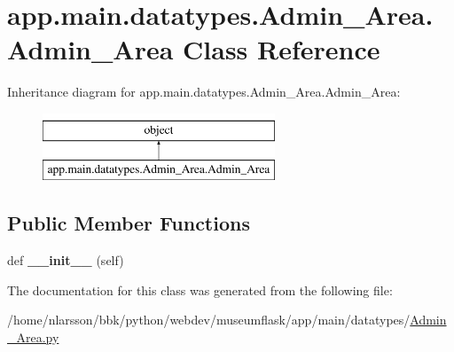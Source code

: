\hypertarget{classapp_1_1main_1_1datatypes_1_1Admin__Area_1_1Admin__Area}{}\section{app.\+main.\+datatypes.\+Admin\+\_\+\+Area.\+Admin\+\_\+\+Area Class Reference}
\label{classapp_1_1main_1_1datatypes_1_1Admin__Area_1_1Admin__Area}
Inheritance diagram for app.\+main.\+datatypes.\+Admin\+\_\+\+Area.\+Admin\+\_\+\+Area\+:\begin{figure}[H]
\begin{center}
\leavevmode
\includegraphics[height=2.000000cm]{classapp_1_1main_1_1datatypes_1_1Admin__Area_1_1Admin__Area}
\end{center}
\end{figure}
\subsection*{Public Member Functions}
\begin{DoxyCompactItemize}
\item 
\mbox{\label{classapp_1_1main_1_1datatypes_1_1Admin__Area_1_1Admin__Area_ab1b3d88cfabc030d45e8b5ae6c710a52}} 
def {\bfseries \+\_\+\+\_\+init\+\_\+\+\_\+} (self)
\end{DoxyCompactItemize}


The documentation for this class was generated from the following file\+:\begin{DoxyCompactItemize}
\item 
/home/nlarsson/bbk/python/webdev/museumflask/app/main/datatypes/\mbox{\hyperlink{Admin__Area_8py}{Admin\+\_\+\+Area.\+py}}\end{DoxyCompactItemize}

